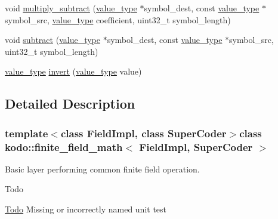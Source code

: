 \begin{DoxyCompactItemize}
void \hyperlink{classkodo_1_1finite__field__math_aa3840069ffcc2b3634c5a501ff171590}{multiply\-\_\-subtract} (\hyperlink{classkodo_1_1finite__field__math_a6539f35f436d64698ed6dd7d40ae3ab8}{value\-\_\-type} $\ast$symbol\-\_\-dest, const \hyperlink{classkodo_1_1finite__field__math_a6539f35f436d64698ed6dd7d40ae3ab8}{value\-\_\-type} $\ast$symbol\-\_\-src, \hyperlink{classkodo_1_1finite__field__math_a6539f35f436d64698ed6dd7d40ae3ab8}{value\-\_\-type} coefficient, uint32\-\_\-t symbol\-\_\-length)
\begin{DoxyCompactList}\small\item\em \end{DoxyCompactList}\item 
void \hyperlink{classkodo_1_1finite__field__math_a81629ff252a286fc6e42cf90b0e70b57}{subtract} (\hyperlink{classkodo_1_1finite__field__math_a6539f35f436d64698ed6dd7d40ae3ab8}{value\-\_\-type} $\ast$symbol\-\_\-dest, const \hyperlink{classkodo_1_1finite__field__math_a6539f35f436d64698ed6dd7d40ae3ab8}{value\-\_\-type} $\ast$symbol\-\_\-src, uint32\-\_\-t symbol\-\_\-length)
\begin{DoxyCompactList}\small\item\em \end{DoxyCompactList}\item 
\hyperlink{classkodo_1_1finite__field__math_a6539f35f436d64698ed6dd7d40ae3ab8}{value\-\_\-type} \hyperlink{classkodo_1_1finite__field__math_a859db56aca42e27f01eb4998feaffb2d}{invert} (\hyperlink{classkodo_1_1finite__field__math_a6539f35f436d64698ed6dd7d40ae3ab8}{value\-\_\-type} value)
\begin{DoxyCompactList}\small\item\em \end{DoxyCompactList}\end{DoxyCompactItemize}


\subsection{Detailed Description}
\subsubsection*{template$<$class Field\-Impl, class Super\-Coder$>$class kodo\-::finite\-\_\-field\-\_\-math$<$ Field\-Impl, Super\-Coder $>$}

Basic layer performing common finite field operation. 

\begin{DoxyRefDesc}{Todo}
\item[\hyperlink{todo__todo000019}{Todo}]Missing or incorrectly named unit test\end{DoxyRefDesc}


